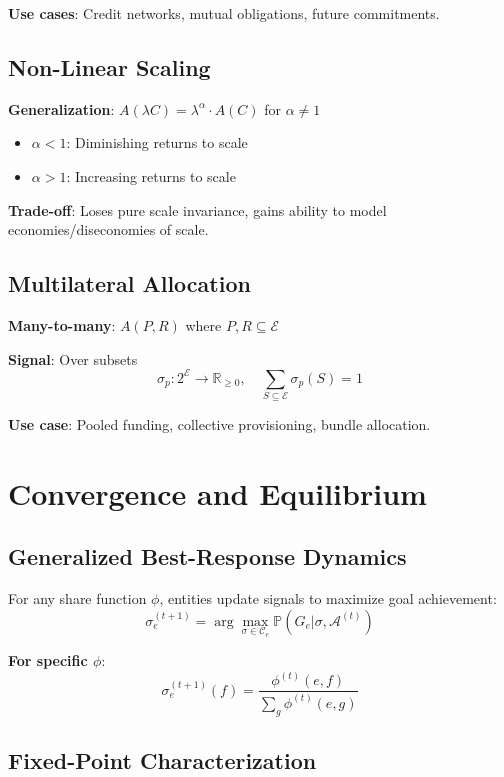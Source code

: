 \documentclass[11pt,a4paper]{article}
\theoremstyle{definition}
\theoremstyle{remark}
\newcommand{\E}{\mathcal{E}}
\begin{document}
\textbf{Use cases}: Credit networks, mutual obligations, future commitments.

\subsection{Non-Linear Scaling}

\textbf{Generalization}: $A(\lambda C) = \lambda^\alpha \cdot A(C)$ for $\alpha \ne 1$

\begin{itemize}
\item $\alpha < 1$: Diminishing returns to scale
\item $\alpha > 1$: Increasing returns to scale
\end{itemize}

\textbf{Trade-off}: Loses pure scale invariance, gains ability to model economies/diseconomies of scale.

\subsection{Multilateral Allocation}

\textbf{Many-to-many}: $A(P, R)$ where $P, R \subseteq \E$

\textbf{Signal}: Over subsets
\[ \sigma_p: 2^{\E} \to \mathbb{R}_{\ge 0}, \quad \sum_{S \subseteq \E} \sigma_p(S) = 1 \]

\textbf{Use case}: Pooled funding, collective provisioning, bundle allocation.

\section{Convergence and Equilibrium}

\subsection{Generalized Best-Response Dynamics}

For any share function $\phi$, entities update signals to maximize goal achievement:
\[ \sigma_e^{(t+1)} = \arg\max_{\sigma \in \mathcal{C}_e} \mathbb{P}(G_e | \sigma, \mathcal{A}^{(t)}) \]

\textbf{For specific $\phi$}:
\[ \sigma_e^{(t+1)}(f) = \frac{\phi^{(t)}(e,f)}{\sum_g \phi^{(t)}(e,g)} \]

\subsection{Fixed-Point Characterization}
\end{document}
